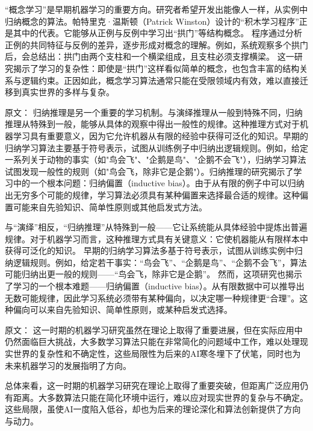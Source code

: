 “概念学习”是早期机器学习的重要方向。研究者希望开发出能像人一样，从实例中归纳概念的算法。帕特里克·温斯顿（Patrick Winston）设计的“积木学习程序”正是其中的代表。它能够从正例与反例中学习出“拱门”等结构概念。  
程序通过分析正例的共同特征与反例的差异，逐步形成对概念的理解。例如，系统观察多个拱门后，会总结出：拱门由两个支柱和一个横梁组成，且支柱必须支撑横梁。  
这一研究揭示了学习的复杂性：即使是“拱门”这样看似简单的概念，也包含丰富的结构关系与逻辑约束。正因如此，概念学习算法通常只能在受限领域内有效，难以直接迁移到真实世界的多样与复杂。

原文：
归纳推理是另一个重要的学习机制。与演绎推理从一般到特殊不同，归纳推理从特殊到一般，能够从具体的观察中得出一般性的规律。这种推理方式对于机器学习具有重要意义，因为它允许机器从有限的经验中获得可泛化的知识。早期的归纳学习算法主要基于符号表示，试图从训练例子中归纳出逻辑规则。例如，给定一系列关于动物的事实（如"鸟会飞"、"企鹅是鸟"、"企鹅不会飞"），归纳学习算法试图发现一般性的规则（如"鸟会飞，除非它是企鹅"）。归纳推理的研究揭示了学习中的一个根本问题：归纳偏置（inductive bias）。由于从有限的例子中可以归纳出无穷多个可能的规律，学习算法必须具有某种偏置来选择最合适的规律。这种偏置可能来自先验知识、简单性原则或其他启发式方法。

与“演绎”相反，“归纳推理”从特殊到一般——它让系统能从具体经验中提炼出普遍规律。对于机器学习而言，这种推理方式具有关键意义：它使机器能从有限样本中获得可泛化的知识。  
早期的归纳学习算法多基于符号表示，试图从训练实例中归纳逻辑规则。例如，给定若干事实：“鸟会飞”、“企鹅是鸟”、“企鹅不会飞”，算法可能归纳出更一般的规则——“鸟会飞，除非它是企鹅”。  
然而，这项研究也揭示了学习的一个根本难题——归纳偏置（inductive bias）。从有限数据中可以推导出无数可能规律，因此学习系统必须带有某种偏向，以决定哪一种规律更“合理”。这种偏向可以来自先验知识、简单性原则，或某种启发式选择。

原文：
这一时期的机器学习研究虽然在理论上取得了重要进展，但在实际应用中仍然面临巨大挑战，大多数学习算法只能在非常简化的问题域中工作，难以处理现实世界的复杂性和不确定性，这些局限性为后来的AI寒冬埋下了伏笔，同时也为未来机器学习的发展指明了方向。

总体来看，这一时期的机器学习研究在理论上取得了重要突破，但距离广泛应用仍有距离。大多数算法只能在简化环境中运行，难以应对现实世界的复杂与不确定。这些局限，虽使AI一度陷入低谷，却也为后来的理论深化和算法创新提供了方向与动力。

